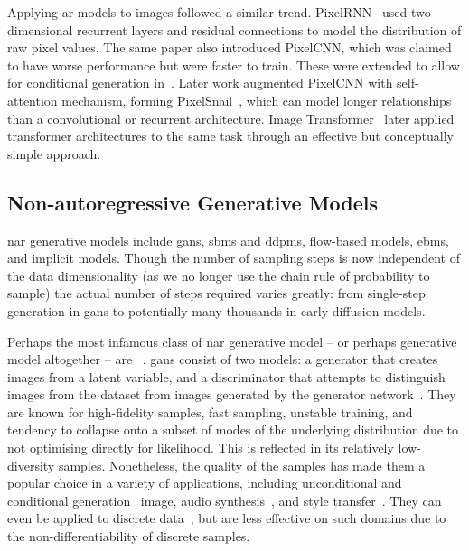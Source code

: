 Applying \gls{ar} models to images followed a similar trend.
PixelRNN~\cite{oord2016pixelrnn} used two-dimensional recurrent layers and
residual connections to model the distribution of raw pixel values. The same
paper also introduced PixelCNN, which was claimed to have worse performance but
were faster to train. These were extended to allow for conditional generation
in~\cite{oord2016pixelcnn}. Later work augmented PixelCNN with self-attention
mechanism, forming PixelSnail~\cite{chen2017snail}, which can model
longer relationships than a convolutional or recurrent architecture. Image
Transformer~\cite{parmar2018image} later applied transformer architectures to
the same task through an effective but conceptually simple approach.

\subsection{Non-autoregressive Generative Models}
\label{subsec:nagm}

\Acrfull{nar} generative models include \glspl{gan}, \glspl{sbm} and
\glspl{ddpm}, flow-based models, \glspl{ebm}, and implicit models. Though the
number of sampling steps is now independent of the data dimensionality (as we no
longer use the chain rule of probability to sample) the actual number of steps
required varies greatly: from single-step generation in \glspl{gan} to
potentially many thousands in early diffusion models.

Perhaps the most infamous class of \gls{nar} generative model -- or perhaps
generative model altogether -- are ~\cite{goodfellow2014gan}.
\Glspl{gan} consist of two models: a generator that creates images from a latent
variable, and a discriminator that attempts to distinguish images from the
dataset from images generated by the generator network~\cite{goodfellow2014gan}.
They are known for high-fidelity samples, fast sampling, unstable training, and
tendency to collapse onto a subset of modes of the underlying distribution due
to not optimising directly for likelihood. This is reflected in its relatively
low-diversity samples. Nonetheless, the quality of the samples has made them a
popular choice in a variety of applications, including unconditional and
conditional generation~\cite{tero2018stylegan,andrew2018biggan} image, audio
synthesis~\cite{liu2020audiogan}, and style transfer~\cite{zhu2017cyclegan}.
They can even be applied to discrete data~\cite{autume2019scratchgan}, but are
less effective on such domains due to the non-differentiability of discrete
samples.

